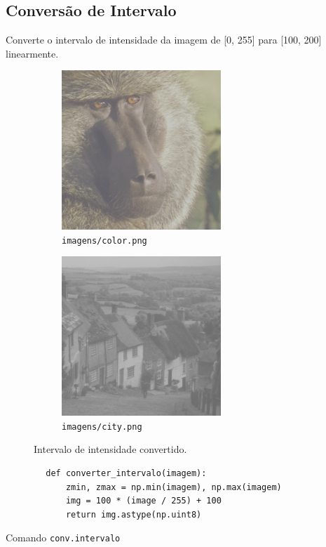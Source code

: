 \subsection{Conversão de Intervalo}

Converte o intervalo de intensidade da imagem de [0, 255] para [100, 200] linearmente.

\begin{figure}[H]
    \centering
    \begin{subfigure}{0.45\textwidth}
        \centering
        \includegraphics[width=6cm]{resultados/colorconv.png}
        \caption{\texttt{imagens/color.png}}
    \end{subfigure}%
    \begin{subfigure}{0.45\textwidth}
        \centering
        \includegraphics[width=6cm]{resultados/cityconv.png}
        \caption{\texttt{imagens/city.png}}
        \label{fig:res:4}
    \end{subfigure}

    \caption{Intervalo de intensidade convertido.}
\end{figure}

\begin{listing}[H]
    \begin{verbatim}
        def converter_intervalo(imagem):
            zmin, zmax = np.min(imagem), np.max(imagem)
            img = 100 * (image / 255) + 100
            return img.astype(np.uint8)
    \end{verbatim}

    \caption{Comando \texttt{conv.intervalo}}
\end{listing}

